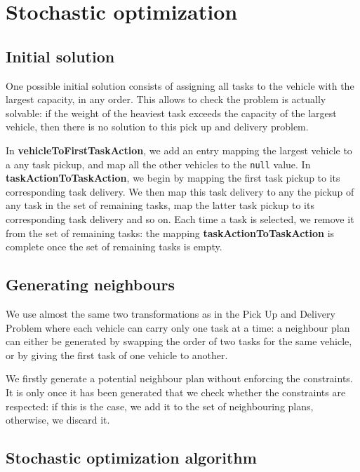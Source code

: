 \documentclass[10pt]{article}
\begin{document}
\section{Stochastic optimization}

\subsection{Initial solution}

One possible initial solution consists of assigning all tasks to the vehicle with the largest capacity, in any order. This allows to check the problem is actually solvable: if the weight of the heaviest task exceeds the capacity of the largest vehicle, then there is no solution to this pick up and delivery problem.

In \textbf{vehicleToFirstTaskAction}, we add an entry mapping the largest vehicle to a any task pickup, and map all the other vehicles to the \texttt{null} value.
In \textbf{taskActionToTaskAction}, we begin by mapping the first task pickup to its corresponding task delivery. We then map this task delivery to any the pickup of any task in the set of remaining tasks, map the latter task pickup to its corresponding task delivery and so on.
Each time a task is selected, we remove it from the set of remaining tasks: the mapping \textbf{taskActionToTaskAction} is complete once the set of remaining tasks is empty.

\subsection{Generating neighbours}

We use almost the same two transformations as in the Pick Up and Delivery Problem where each vehicle can carry only one task at a time: a neighbour plan can either be generated by swapping the order of two tasks for the same vehicle, or by giving the first task of one vehicle to another.

We firstly generate a potential neighbour plan without enforcing the constraints. It is only once it has been generated that we check whether the constraints are respected: if this is the case, we add it to the set of neighbouring plans, otherwise, we discard it.

\subsection{Stochastic optimization algorithm}
\end{document}
